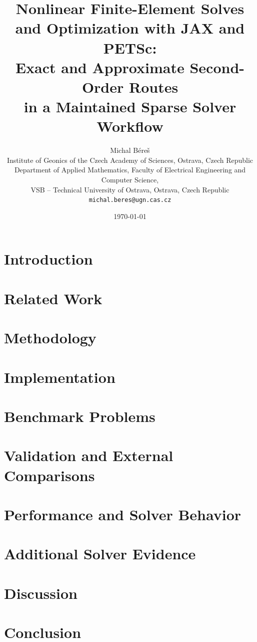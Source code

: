 \documentclass[10pt,a4paper]{article}
\title{Nonlinear Finite-Element Solves and Optimization with JAX and PETSc:\\
\large Exact and Approximate Second-Order Routes\\
\large in a Maintained Sparse Solver Workflow}
\author{
Michal B{\'e}re{\v{s}}\\
\small Institute of Geonics of the Czech Academy of Sciences, Ostrava, Czech Republic\\
\small Department of Applied Mathematics, Faculty of Electrical Engineering and Computer Science,\\
\small VSB -- Technical University of Ostrava, Ostrava, Czech Republic\\
\small \texttt{michal.beres@ugn.cas.cz}
}
\date{\today}
\begin{document}
\maketitle


\section{Introduction}


\section{Related Work}


\section{Methodology}


\section{Implementation}


\section{Benchmark Problems}


\section{Validation and External Comparisons}


\section{Performance and Solver Behavior}


\section{Additional Solver Evidence}


\section{Discussion}


\section{Conclusion}




\end{document}

